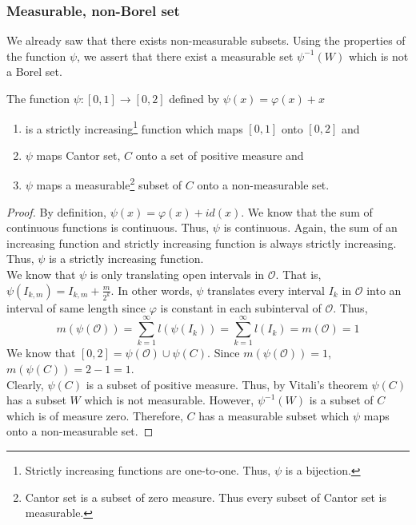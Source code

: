\subsubsection{Measurable, non-Borel set}
	We already saw that there exists non-measurable subsets.
	Using the properties of the function $\psi$, we assert that there exist a measurable set $\psi^{-1}(W)$ which is not a Borel set.
\begin{theorem}
	The function $\psi : [0,1] \to [0,2]$ defined by $\psi(x) = \varphi(x)+x$
	\begin{enumerate}
		\item is a strictly increasing\dag\footnote{
				Strictly increasing functions are one-to-one.
				Thus, $\psi$ is a bijection.}
			function which maps $[0,1]$ onto $[0,2]$ and
		\item $\psi$ maps Cantor set, $C$ onto a set of positive measure and
		\item $\psi$ maps a measurable\dag\footnote{
			Cantor set is a subset of zero measure.
			Thus every subset of Cantor set is measurable.}
		subset of $C$ onto a non-measurable set.
	\end{enumerate}
\end{theorem}
\begin{proof}
	By definition, $\psi(x) = \varphi(x) + id(x)$.
	We know that the sum of continuous functions is continuous.
	Thus, $\psi$ is continuous.
	Again, the sum of an increasing function and strictly increasing function is always strictly increasing.
	Thus, $\psi$ is a strictly increasing function.\\

	We know that $\psi$ is only translating open intervals in $\mathcal{O}$.
	That is, $\psi(I_{k,m}) = I_{k,m} + \frac{m}{2^k}$.
	In other words, $\psi$ translates every interval $I_k$ in $\mathcal{O}$ into an interval of same length since $\varphi$ is constant in each subinterval of $\mathcal{O}$.
	Thus,
	\[ \displaystyle m(\psi(\mathcal{O})) = \sum_{k=1}^\infty l(\psi(I_k)) = \sum_{k=1}^\infty l(I_k) = m(\mathcal{O}) = 1 \]
	We know that $[0,2] = \psi(\mathcal{O}) \cup \psi(C)$.
	Since $m(\psi(\mathcal{O})) = 1$, $m(\psi(C)) = 2-1 = 1$.\\

	Clearly, $\psi(C)$ is a subset of positive measure.
	Thus, by Vitali's theorem $\psi(C)$ has a subset $W$ which is not measurable.
	However, $\psi^{-1}(W)$ is a subset of $C$ which is of measure zero.
	Therefore, $C$ has a measurable subset which $\psi$ maps onto a non-measurable set.
\end{proof}


